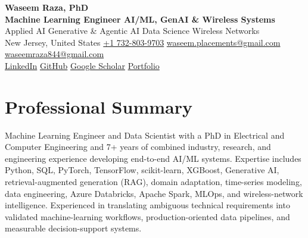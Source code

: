 \documentclass[9pt,letterpaper]{extarticle}
\begin{document}
\begin{center}
{\LARGE\bfseries Waseem Raza, PhD}\\[2pt]
{\large\bfseries Machine Learning Engineer \textbar{} AI/ML, GenAI \& Wireless Systems}\\[1pt]
{\small Applied AI \textbar{} Generative \& Agentic AI \textbar{} Data Science \textbar{} Wireless Networks}\\[3pt]
{\footnotesize New Jersey, United States \quad {}\enspace \href{tel:+17328039703}{+1 732-803-9703} \quad {}\enspace \href{mailto:waseem.placements@gmail.com}{waseem.placements@gmail.com} \textbar{} \href{mailto:waseemraza844@gmail.com}{waseemraza844@gmail.com}\\[1pt]\href{https://www.linkedin.com/in/waseem-raza-phd-9a737858/}{LinkedIn} \textbar{} \href{https://github.com/WaseemRaza844}{GitHub} \textbar{} \href{https://scholar.google.com/citations?user=d58Drr0AAAAJ\&hl=en}{Google Scholar} \textbar{} \href{https://waseemraza844.github.io/portfolio/}{Portfolio}}
\end{center}
\vspace{-5pt}
\section{Professional Summary}
Machine Learning Engineer and Data Scientist with a PhD in Electrical and Computer Engineering and 7+ years of combined industry, research, and engineering experience developing end-to-end AI/ML systems. Expertise includes Python, SQL, PyTorch, TensorFlow, scikit-learn, XGBoost, Generative AI, retrieval-augmented generation (RAG), domain adaptation, time-series modeling, data engineering, Azure Databricks, Apache Spark, MLOps, and wireless-network intelligence. Experienced in translating ambiguous technical requirements into validated machine-learning workflows, production-oriented data pipelines, and measurable decision-support systems.
\end{document}
